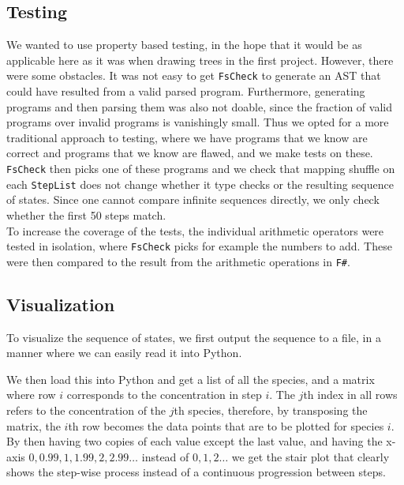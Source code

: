 \subsection{Testing}
We wanted to use property based testing, in the hope that it would be as applicable here as it was when drawing trees in the first project. However, there were some obstacles. It was not easy to get \texttt{FsCheck} to generate an AST that could have resulted from a valid parsed program. Furthermore, generating programs and then parsing them was also not doable, since the fraction of valid programs over invalid programs is vanishingly small. Thus we opted for a more traditional approach to testing, where we have programs that we know are correct and programs that we know are flawed, and we make tests on these. \texttt{FsCheck} then picks one of these programs and we check that mapping shuffle on each \texttt{StepList} does not change whether it type checks or the resulting sequence of states. Since one cannot compare infinite sequences directly, we only check whether the first 50 steps match.\\

To increase the coverage of the tests, the individual arithmetic operators were tested in isolation, where \texttt{FsCheck} picks for example the numbers to add. These were then compared to the result from the arithmetic operations in \texttt{F\#}.

\subsection{Visualization}
To visualize the sequence of states, we first output the sequence to a file, in a manner where we can easily read it into Python.

We then load this into Python and get a list of all the species, and a matrix where row $i$ corresponds to the concentration in step $i$. The $j$th index in all rows refers to the concentration of the $j$th species, therefore, by transposing the matrix, the $i$th row becomes the data points that are to be plotted for species $i$. By then having two copies of each value except the last value, and having the x-axis $0,0.99,1,1.99,2,2.99\dots$ instead of $0,1,2\dots$ we get the stair plot that clearly shows the step-wise process instead of a continuous progression between steps.

